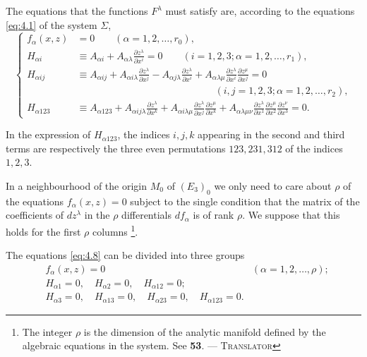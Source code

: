 \documentclass[leqno,11pt]{book}
\numberwithin{equation}{chapter}
\newcommand{\pd}{\partial}
\theoremstyle{shape1}
\theoremstyle{shape0}
\theoremstyle{shape2}
\theoremstyle{definition}
\begin{document}
The equations that the functions $F^{\lambda}$ must satisfy are, according to the equations \eqref{eq:4.1} of the system $\Sigma$,
\begin{equation}
  \label{eq:4.8}
  \left\{
    \begin{aligned}
      f_{\alpha}(x,z)&=0\qquad(\alpha=1,2,\dots,r_{0}),\\
      H_{\alpha i}&\equiv A_{\alpha i}+A_{\alpha \lambda}\frac{\pd z^{\lambda}}{\pd x^{i}}=0\qquad(i=1,2,3;\alpha=1,2,\dots,r_{1}),\\
      H_{\alpha ij}&\equiv A_{\alpha ij}+A_{\alpha i\lambda}\frac{\pd z^{\lambda}}{\pd x^{j}}-A_{\alpha j\lambda}\frac{\pd z^{\lambda}}{\pd x^{i}}+A_{\alpha \lambda \mu}\frac{\pd z^{\lambda}}{\pd x^{i}}\frac{\pd z^{\mu}}{\pd x^{j}}=0\\
      &\qquad\qquad\qquad\qquad\qquad\qquad\qquad(i,j=1,2,3;\alpha=1,2,\dots,r_{2}),\\
H_{\alpha 123}&\equiv A_{\alpha 123}+A_{\alpha ij\lambda}\frac{\pd z^{\lambda}}{\pd x^{k}}+A_{\alpha i \lambda\mu}\frac{\pd z^{\lambda}}{\pd x^{j}}\frac{\pd z^{\mu}}{\pd x^{k}}+A_{\alpha\lambda\mu\nu}\frac{\pd z^{\lambda}}{\pd x^{1}}\frac{\pd z^{\mu}}{\pd x^{2}}\frac{\pd z^{\nu}}{\pd x^{3}}=0.
    \end{aligned}
  \right.
\end{equation}

In the expression of $H_{\alpha 123}$, the indices $i,j,k$  appearing in the second and third terms are respectively the three even permutations $123,231,312$ of the indices $1,2,3$.

In a neighbourhood of the origin $M_{0}$ of $(E_{3})_{0}$ we  only need to care about $\rho$ of the equations $f_{\alpha}(x,z)=0$ subject to the single condition that the matrix of the coefficients of $dz^{\lambda}$ in the $\rho$ differentials $df_{\alpha}$ is of rank $\rho$. We suppose that this holds for the first $\rho$ columns \footnote{The integer $\rho$ is the dimension of the analytic manifold defined by the algebraic equations in the system. See \textsection\textbf{53}. --- \textsc{Translator}}.

The equations \eqref{eq:4.8} can be divided into three groups
\begin{align}
\label{eq:4.a}&f_{\alpha}(x,z)=0&(\alpha=1,2,\dots,\rho);\tag{A}\\
\label{eq:4.b}&H_{\alpha1}=0,\quad H_{\alpha 2}=0,\quad H_{\alpha 12}=0;\tag{B}\\
\label{eq:4.c}&H_{\alpha 3}=0,\quad H_{\alpha 13}=0,\quad H_{\alpha23}=0,\quad H_{\alpha 123}=0.\tag{C}
\end{align}
\end{document}
